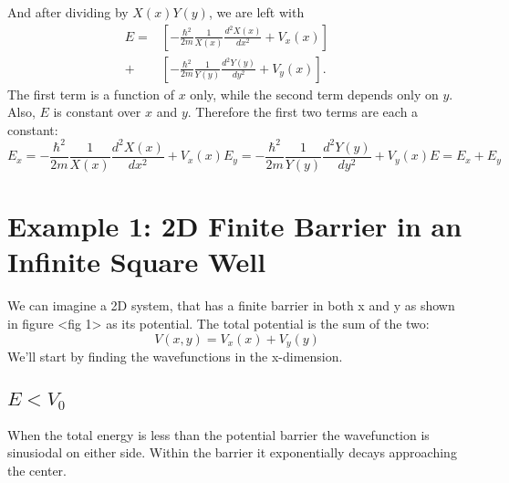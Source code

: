 \documentclass[aps,twocolumn,secnumarabic,nobalancelastpage,amsmath,amssymb,
nofootinbib]{revtex4}
\begin{document}
%
And after dividing by $X(x)Y(y)$, we are left with
\begin{align}
\nonumber
E=&\left[-\frac{\hbar^2}{2m}\frac{1}{X(x)}\frac{d^2X(x)}{dx^2}+V_x(x)\right]&&\\
+&\left[-\frac{\hbar^2}{2m}\frac{1}{Y(y)}\frac{d^2Y(y)}{dy^2}+V_y(x)\right].&&
\label{eq:schro_3}
\end{align}
%
The first term is a function of $x$ only, while the second term depends only
on $y$. Also, $E$ is constant over $x$ and $y$. Therefore the first two terms
are each a constant:
\begin{subequations}
\label{eq:schro_sep}
\begin{equation}
E_x = -\frac{\hbar^2}{2m}\frac{1}{X(x)}\frac{d^2X(x)}{dx^2}+V_x(x)
\label{subeq:schro_sep_x}
\end{equation}
\begin{equation}
E_y = -\frac{\hbar^2}{2m}\frac{1}{Y(y)}\frac{d^2Y(y)}{dy^2}+V_y(x)
\label{subeq:schro_sep_y}
\end{equation}
\begin{equation}
E=E_x+E_y
\label{subeq:schro_sep_E}
\end{equation}
\end{subequations}
\section{Example 1: 2D Finite Barrier in an Infinite Square Well}
We can imagine a 2D system, that has a finite barrier in both x and y as
shown in figure <fig 1> as its potential. The total potential is the sum of
the two:
\begin{equation}
V(x,y) = V_x(x) + V_y(y)
\label{eq:potential_fin_barr}
\end{equation}
We'll start by finding the wavefunctions in the x-dimension.

\subsection{$E<V_0$}
When the total energy is less than the potential barrier the wavefunction
is sinusiodal on either side. Within the barrier it exponentially decays
approaching the center.

\end{document}
